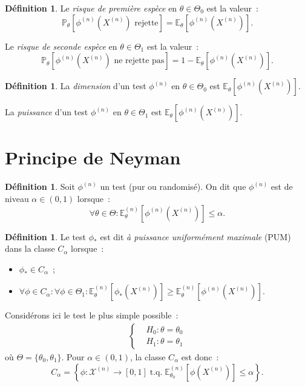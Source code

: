 \documentclass{report}
\DeclareMathOperator{\tq}{\text{ t.q. }}
\renewcommand{\P}{\mathbb P}
\newcommand{\E}{\mathbb E}
\newcommand{\n}{{(n)}}
\theoremstyle{definition}
\newtheorem{déf}[thm]{Définition}
\theoremstyle{remark}
\begin{document}
	\begin{déf} Le \textit{risque de première espèce} en $\theta \in \Theta_0$ est la valeur~:
	\[\P_\theta[\phi^\n(X^\n) \text{ rejette}] = \E_\theta[\phi^\n(X^\n)].\]

	Le \textit{risque de seconde espèce} en $\theta \in \Theta_1$ est la valeur~:
	\[\P_\theta[\phi^\n(X^\n) \text{ ne rejette pas}] = 1 - \E_\theta[\phi^\n(X^\n)].\]
	\end{déf}

	\begin{déf} La \textit{dimension} d'un test $\phi^\n$ en $\theta \in \Theta_0$ est $\E_\theta[\phi^\n(X^\n)]$.

	La \textit{puissance} d'un test $\phi^\n$ en $\theta \in \Theta_1$ est $\E_\theta[\phi^\n(X^\n)]$.
	\end{déf}

	\section{Principe de Neyman}
		\begin{déf} Soit $\phi^\n$ un test (pur ou randomisé). On dit que $\phi^\n$ est de niveau $\alpha \in (0, 1)$ lorsque~:
		\[\forall \theta \in \Theta : \E_\theta^\n[\phi^\n(X^\n)] \leq \alpha.\]
		\end{déf}

		\begin{déf} Le test $\phi_*$ est dit \textit{à puissance uniformément maximale} (PUM) dans la classe $C_\alpha$ lorsque~:
		\begin{itemize}
			\item $\phi_* \in C_\alpha$~;
			\item $\forall \phi \in C_\alpha : \forall \phi \in \Theta_1 : \E_\theta^\n[\phi_*(X^\n)] \geq \E_\theta^\n[\phi^\n(X^\n)]$.
		\end{itemize}
		\end{déf}

		Considérons ici le test le plus simple possible~:
		\begin{align}\label{eq:test_simple}
			\begin{cases}
				&H_0 : \theta = \theta_0 \\
				&H_1 : \theta = \theta_1
			\end{cases}
		\end{align}
		où $\Theta = \{\theta_0, \theta_1\}$. Pour $\alpha \in (0, 1)$, la classe $C_\alpha$ est donc~:
		\[C_\alpha = \left\{\phi : \mathcal X^\n \to [0, 1] \tq \E_{\theta_0}^\n[\phi(X^\n)] \leq \alpha\right\}.\]
\end{document}
